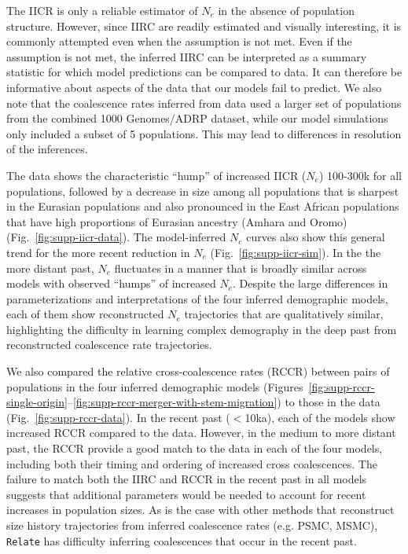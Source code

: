 \documentclass[]{article}
\newcommand{\Relate}{\texttt{Relate}\xspace}
\begin{document}
The IICR is only a reliable estimator of $N_e$ in the absence of population structure.
However, since IIRC are readily estimated and visually interesting,
it is commonly attempted even when the assumption is not met.
Even if the assumption is not met, the inferred IIRC can be interpreted as a
summary statistic for which model predictions can be compared to data.
It can therefore be
informative about aspects of the data that our models fail to predict.
We also note that the coalescence rates inferred from data used a larger set of
populations from the combined 1000 Genomes/ADRP dataset, while our model
simulations only included a subset of 5 populations. This may lead to
differences in resolution of the inferences.

The data shows the characteristic ``hump'' of increased IICR ($N_e$) 100-300k
for all populations, followed by a decrease in size among all populations that
is sharpest in the Eurasian populations and also pronounced in the East African
populations that have high proportions of Eurasian ancestry (Amhara and Oromo)
(Fig.~\ref{fig:supp-iicr-data}). The model-inferred $N_e$ curves also show this
general trend for the more recent reduction in $N_e$
(Fig.~\ref{fig:supp-iicr-sim}). In the the more distant past, $N_e$ fluctuates
in a manner that is broadly similar across models with observed ``humps'' of
increased $N_e$. Despite the large differences in parameterizations and
interpretations of the four inferred demographic models, each of them show
reconstructed $N_e$ trajectories that are qualitatively similar, highlighting
the difficulty in learning complex demography in the deep past from
reconstructed coalescence rate trajectories.

We also compared the relative cross-coalescence rates (RCCR) between pairs of
populations in the four inferred demographic models
(Figures~\ref{fig:supp-rccr-single-origin}--\ref{fig:supp-rccr-merger-with-stem-migration})
to those in the data (Fig.~\ref{fig:supp-rccr-data}). In the recent past
($<$10ka), each of the models show increased RCCR compared to the data.
However, in the medium to more distant past, the RCCR provide a good match to
the data in each of the four models, including both their timing and ordering
of increased cross coalescences. The failure to match both the IIRC and RCCR in
the recent past in all models suggests that additional parameters would be
needed to account for recent increases in population sizes. As is the case with
other methods that reconstruct size history trajectories from inferred coalescence
rates (e.g. PSMC, MSMC), \Relate has difficulty inferring coalescences that
occur in the recent past.
\end{document}
